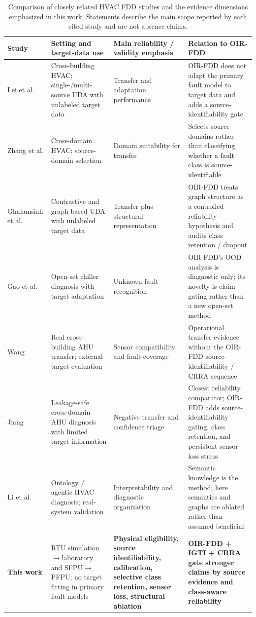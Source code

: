 \documentclass[preprint,12pt]{elsarticle}
\begin{document}
\begin{table}[H]
\centering
\caption{Comparison of closely related HVAC FDD studies and the evidence dimensions emphasized in this work. Statements describe the main scope reported by each cited study and are not absence claims.}
\label{tab:literature_compare}
\scriptsize
\setlength{\tabcolsep}{4pt}
\begin{tabularx}{\textwidth}{p{2.2cm}p{3.5cm}p{4.0cm}X}
\toprule
Study & Setting and target-data use & Main reliability / validity emphasis & Relation to OIR-FDD \\
\midrule
Lei et al. \cite{lei2025} & Cross-building HVAC; single-/multi-source UDA with unlabeled target data & Transfer and adaptation performance & OIR-FDD does not adapt the primary fault model to target data and adds a source-identifiability gate \\
Zhang et al. \cite{zhang2025source} & Cross-domain HVAC; source-domain selection & Domain suitability for transfer & Selects source domains rather than classifying whether a fault class is source-identifiable \\
Ghalamsiah et al. \cite{ghalamsiah2025can,ghalamsiah2026graph} & Contrastive and graph-based UDA with unlabeled target data & Transfer plus structural representation & OIR-FDD treats graph structure as a controlled reliability hypothesis and audits class retention / dropout \\
Gao et al. \cite{gao2026open} & Open-set chiller diagnosis with target adaptation & Unknown-fault recognition & OIR-FDD's OOD analysis is diagnostic only; its novelty is claim gating rather than a new open-set method \\
Wang \cite{wang2026cross} & Real cross-building AHU transfer; external target evaluation & Sensor compatibility and fault coverage & Operational transfer evidence without the OIR-FDD source-identifiability / CRRA sequence \\
Jiang \cite{jiang2026leakage} & Leakage-safe cross-domain AHU diagnosis with limited target information & Negative transfer and confidence triage & Closest reliability comparator; OIR-FDD adds source-identifiability gating, class retention, and persistent sensor-loss stress \\
Li et al. \cite{li2026agentic} & Ontology / agentic HVAC diagnosis; real-system validation & Interpretability and diagnostic organization & Semantic knowledge is the method; here semantics and graphs are ablated rather than assumed beneficial \\
\textbf{This work} & RTU simulation$\rightarrow$laboratory and SFPU$\rightarrow$PFPU; no target fitting in primary fault models & \textbf{Physical eligibility, source identifiability, calibration, selective class retention, sensor loss, structural ablation} & \textbf{OIR-FDD + IGTI + CRRA gate stronger claims by source evidence and class-aware reliability} \\
\bottomrule
\end{tabularx}
\end{table}
\end{document}

